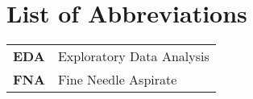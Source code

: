 \section*{List of Abbreviations}

\begin{tabular}{ l l }
  \textbf{EDA} & Exploratory Data Analysis  \\
  \textbf{FNA} & Fine Needle Aspirate      \\
\end{tabular}